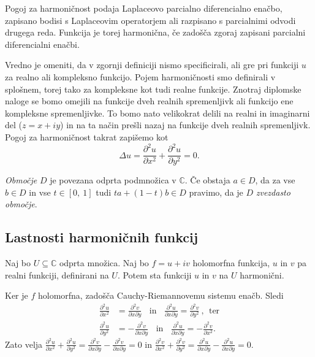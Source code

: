 \documentclass[mat1, tisk]{fmfdelo}
\begin{document}
    Pogoj za harmoničnost podaja Laplaceovo parcialno diferencialno enačbo, zapisano bodisi s Laplaceovim operatorjem ali razpisano s parcialnimi odvodi drugega reda. 
    Funkcija je torej harmonična, če zadošča zgoraj zapisani parcialni diferencialni enačbi. 

    \begin{opomba}
        Vredno je omeniti, da v zgornji definiciji nismo specificirali, ali gre pri funkciji $u$ za realno ali kompleksno funkcijo. 
        Pojem harmoničnosti smo definirali v splošnem, torej tako za kompleksne kot tudi realne funkcije.
        Znotraj diplomske naloge se bomo omejili na funkcije dveh realnih spremenljivk ali funkcijo ene kompleksne spremenljivke. To bomo nato velikokrat delili na realni in imaginarni del ($z = x + iy $) in na ta način prešli nazaj na funkcije dveh realnih spremenljivk.
        Pogoj za harmoničnost takrat zapišemo kot
            $$
                \Delta u = \frac{\partial^2 u}{\partial x ^ 2} +  \frac{\partial^2 u}{\partial y ^ 2}= 0.
            $$
    \end{opomba}

    \begin{definicija}
        \emph{Območje} $D$ je povezana odprta podmnožica v $\mathbb{C}$.
        Če obstaja $a \in D$, da za vse $b \in D$ in vse $t \in [0,~1]$ tudi $t a + (1-t)b \in D$ pravimo, da je $D$ \emph{zvezdasto območje}.
    \end{definicija}

\subsection{Lastnosti harmoničnih funkcij}
    \begin{trditev}
        \label{hh}
        Naj bo $U \subseteq \mathbb{C}$ odprta množica. Naj bo $f = u + iv$ holomorfna funkcija, $u$ in $v$ pa realni funkciji, definirani na $U$. Potem sta funkciji $u$ in $v$ na $U$ harmonični.
    \end{trditev}

    \begin{dokaz}
        Ker je $f$ holomorfna, zadošča Cauchy-Riemannovemu sistemu enačb. Sledi
        \begin{align*}
            \frac{\partial^2 u}{\partial x^2} &= \frac{\partial^2 v}{\partial x \partial y}~~~~\text{in}~~~~\frac{\partial^2 u}{\partial x \partial y} = \frac{\partial^2 v}{\partial y^2}~,~~\text{ter}\\ 
            \frac{\partial^2 u}{\partial y^2} &=  - \frac{\partial^2 v}{\partial x \partial y}~~~~\text{in}~~~~\frac{\partial^2 u}{\partial x \partial y} =  - \frac{\partial^2 v}{\partial x^2}.
        \end{align*}
        Zato velja $\frac{\partial^2 u}{\partial x^2} + \frac{\partial^2 u}{\partial y^2} = \frac{\partial^2 v}{\partial x \partial y} - \frac{\partial^2 v}{\partial x \partial y} =0$ in $\frac{\partial^2 v}{\partial x^2} + \frac{\partial^2 v}{\partial y^2} = \frac{\partial^2 u}{\partial x \partial y} - \frac{\partial^2 u}{\partial x \partial y}=0$.
    \end{dokaz}
\end{document}
